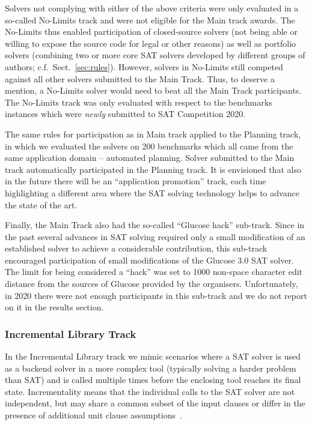 \documentclass{elsarticle}
\begin{document}
Solvers not complying with either of the above criteria were only evaluated in a so-called No-Limits track and were not eligible for the Main track awards.
The No-Limits thus enabled participation of closed-source solvers (not being able or willing to expose the source code for legal or other reasons) 
as well as portfolio solvers (combining two or more core SAT solvers developed by different groups of authors; c.f.~Sect.~\ref{sec:rules}).
However, solvers in No-Limits still competed against all other solvers submitted to the Main Track.
Thus, to deserve a mention, a No-Limits solver would need to beat all the Main Track participants.
The No-Limits track was only evaluated with respect to the benchmarks instances which were \emph{newly} submitted to SAT Competition 2020.

The same rules for participation as in Main track applied to the Planning track, in which we evaluated the solvers on 200 benchmarks 
which all came from the same application domain -- automated planning. 
Solver submitted to the Main track automatically participated in the Planning track.
It is envisioned that also in the future there will be an ``application promotion'' track,
each time highlighting a different area where the SAT solving technology helps to advance the state of the art.

Finally, the Main Track also had the so-called ``Glucose hack'' sub-track. 
Since in the past several advances in SAT solving required only a small modification of an established solver
to achieve a considerable contribution, this sub-track encouraged participation 
of small modifications of the Glucose 3.0 SAT solver. The limit for being considered a ``hack''
was set to 1000 non-space character edit distance from the sources of Glucose provided by the organisers. 
Unfortunately, in 2020 there were not enough participants in this sub-track and we do not report on it 
in the results section.

\subsubsection{Incremental Library Track}

In the Incremental Library track we mimic scenarios
where a SAT solver is used as a backend solver in a more complex tool
(typically solving a harder problem than SAT) and is called multiple times before 
the enclosing tool reaches its final state. Incrementality means that
the individual calls to the SAT solver are not independent, but may share 
a common subset of the input clauses or differ in the presence of additional 
unit clause assumptions~\cite{Nadel:2014:Incremental,Fazekas:2019:IncrementalInprocessing}. 
\end{document}
